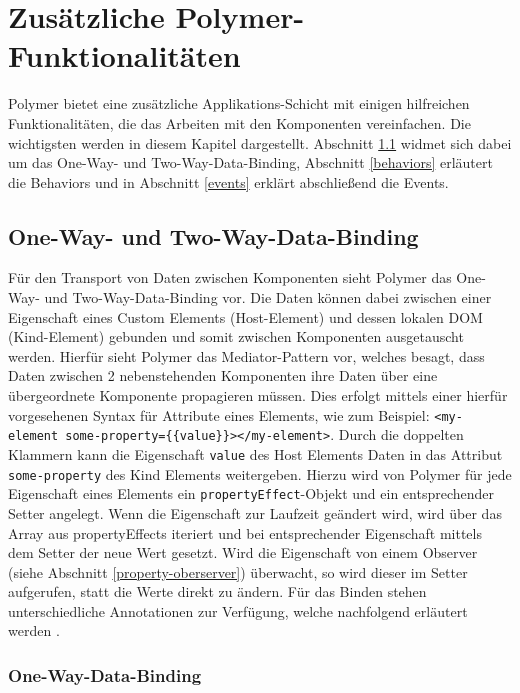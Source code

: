 \chapter{Zusätzliche Polymer-Funktionalitäten}\label{zusaetzliche-polymer-funktionalitaeten}

Polymer bietet eine zusätzliche Applikations-Schicht mit einigen hilfreichen Funktionalitäten, die das Arbeiten mit den Komponenten vereinfachen. Die wichtigsten werden in diesem Kapitel dargestellt. Abschnitt \ref{one-way--und-two-way-data-binding} widmet sich dabei um das One-Way- und Two-Way-Data-Binding, Abschnitt \ref{behaviors} erläutert die Behaviors und in Abschnitt \ref{events} erklärt abschließend die Events.


\section{One-Way- und Two-Way-Data-Binding}\label{one-way--und-two-way-data-binding}

Für den Transport von Daten zwischen Komponenten sieht Polymer das One-Way- und Two-Way-Data-Binding vor. Die Daten können dabei zwischen einer Eigenschaft eines Custom Elements (Host-Element) und dessen lokalen \ac{DOM} (Kind-Element) gebunden und somit zwischen Komponenten ausgetauscht werden. Hierfür sieht Polymer das Mediator-Pattern vor, welches besagt, dass Daten zwischen 2 nebenstehenden Komponenten ihre Daten über eine übergeordnete Komponente propagieren müssen. Dies erfolgt mittels einer hierfür vorgesehenen Syntax für Attribute eines Elements, wie zum Beispiel: \texttt{\textless{}my-element\ some-property=\{\{value\}\}\textgreater{}\textless{}/my-element\textgreater{}}. Durch die doppelten Klammern kann die Eigenschaft \texttt{value} des Host Elements Daten in das Attribut \texttt{some-property} des Kind Elements weitergeben. Hierzu wird von Polymer für jede Eigenschaft eines Elements ein \texttt{propertyEffect}-Objekt und ein entsprechender Setter angelegt. Wenn die Eigenschaft zur Laufzeit geändert wird, wird über das Array aus propertyEffects iteriert und bei entsprechender Eigenschaft mittels dem Setter der neue Wert gesetzt. Wird die Eigenschaft von einem Observer (siehe Abschnitt \ref{property-oberserver}) überwacht, so wird dieser im Setter aufgerufen, statt die Werte direkt zu ändern. Für das Binden stehen unterschiedliche Annotationen zur Verfügung, welche nachfolgend erläutert werden \cite{citeulike:13914892}.


\subsection{One-Way-Data-Binding}\label{one-way-data-binding}

